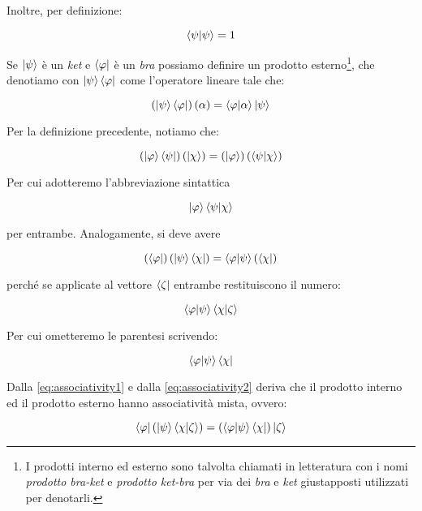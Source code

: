 Inoltre, per definizione:

	\begin{equation} \label{eq:normalizedVectors}
		\braket{\psi}{\psi} = 1
	\end{equation}

Se $\ket{\psi}$ è un \textit{ket} e $\bra{\varphi}$ è un \textit{bra} possiamo definire un prodotto esterno\footnote{I prodotti interno ed esterno sono talvolta chiamati in letteratura con i nomi \textit{prodotto bra-ket} e \textit{prodotto ket-bra} per via dei \textit{bra} e \textit{ket} giustapposti utilizzati per denotarli.}, che denotiamo con $\ket{\psi}\bra{\varphi}$ come l'operatore lineare tale che:

	\begin{equation} \label{eq:outerProduct}
		\left( \ket{\psi}\bra{\varphi} \right)(\alpha) = \braket{\varphi}{\alpha} \ket{\psi}
	\end{equation}

Per la definizione precedente, notiamo che:

	\begin{equation} \label{eq:associativity1}
		\left ( \ket{\varphi} \bra{\psi} \right ) \left ( \ket{ \chi } \right ) = \left ( \ket{\varphi} \right ) \left ( \braket{\psi}{\chi} \right )
	\end{equation}

Per cui adotteremo l'abbreviazione sintattica

	\[
		\ket{\varphi}\braket{\psi}{\chi}
	\]

per entrambe. Analogamente, si deve avere

	\begin{equation} \label{eq:associativity2}
		\left( \bra{\varphi} \right ) \left ( \ket{\psi} \bra{\chi} \right ) = \braket{\varphi}{\psi} \left (\bra{\chi} \right )
	\end{equation}

perché se applicate al vettore $\bra{\zeta}$ entrambe restituiscono il numero:
	
	\[
		\braket{\varphi}{\psi}\braket{\chi}{\zeta}
	\]

Per cui ometteremo le parentesi scrivendo:

	\[
		\braket{\varphi}{\psi}\bra{\chi}
	\]

Dalla \eqref{eq:associativity1} e dalla \eqref{eq:associativity2} deriva che il prodotto interno ed il prodotto esterno hanno associatività mista, ovvero:

	\begin{equation}
		\bra{\varphi} \left( \ket{\psi} \braket{\chi}{\zeta} \right ) =
		\left ( \braket{\varphi}{\psi} \bra{\chi} \right ) \ket{\zeta}
	\end{equation}

